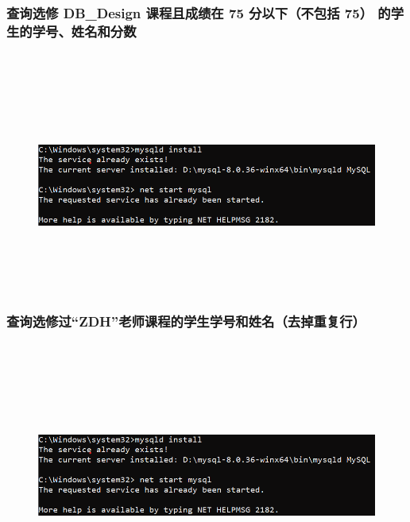 \documentclass{ctexart}
\begin{document}
\subsubsection{查询选修 DB\_Design 课程且成绩在 75 分以下（不包括 75） 的学生的学号、姓名和分数}
\begin{lstlisting}[language=sql]
	
\end{lstlisting}
\begin{figure}[H]
	\centering 
	\includegraphics[height=7cm,width=14cm]{1.png}
	\end{figure}
\subsubsection{查询选修过“ZDH”老师课程的学生学号和姓名（去掉重复行）}
\begin{lstlisting}[language=sql]
	
\end{lstlisting}
\begin{figure}[H]
	\centering 
	\includegraphics[height=7cm,width=14cm]{1.png}
	\end{figure}
\end{document}
